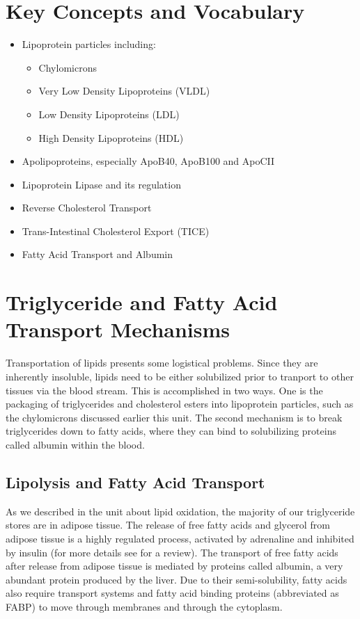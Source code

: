 \documentclass{tufte-handout}
\begin{document}
\section{Key Concepts and Vocabulary}

\begin{itemize}
	\item Lipoprotein particles including:
	\begin{itemize}
		\item Chylomicrons
		\item Very Low Density Lipoproteins (VLDL)
		\item Low Density Lipoproteins (LDL)
		\item High Density Lipoproteins (HDL)
	\end{itemize}
	\item Apolipoproteins, especially ApoB40, ApoB100 and ApoCII
	\item Lipoprotein Lipase and its regulation
	\item Reverse Cholesterol Transport
	\item Trans-Intestinal Cholesterol Export (TICE)
	\item Fatty Acid Transport and Albumin
\end{itemize}

\section{Triglyceride and Fatty Acid Transport Mechanisms}

Transportation of lipids presents some logistical problems.  Since they are inherently insoluble, lipids need to be either solubilized prior to tranport to other tissues via the blood stream.  This is accomplished in two ways.  One is the packaging of triglycerides and cholesterol esters into lipoprotein particles, such as the chylomicrons discussed earlier this unit.  The second mechanism is to break triglycerides down to fatty acids, where they can bind to solubilizing proteins called albumin within the blood.

\subsection{Lipolysis and Fatty Acid Transport}

As we described in the unit about lipid oxidation, the majority of our triglyceride stores are in adipose tissue.  The release of free fatty acids and glycerol from adipose tissue is a highly regulated process, activated by adrenaline and inhibited by insulin (for more details see \citet{Zechner2012} for a review).  The transport of free fatty acids after release from adipose tissue is mediated by proteins called albumin, a very abundant protein produced by the liver.  Due to their semi-solubility, fatty acids also require transport systems and fatty acid binding proteins (abbreviated as FABP) to move through membranes and through the cytoplasm.
\end{document}
